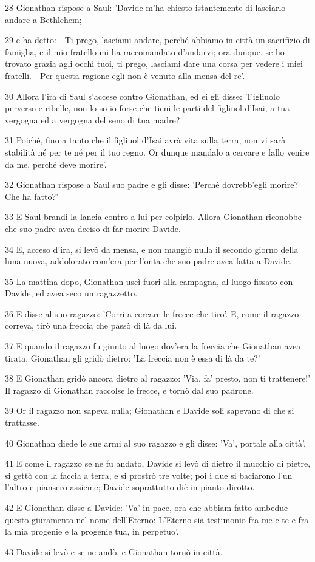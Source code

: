 \par 28 Gionathan rispose a Saul: 'Davide m'ha chiesto istantemente di lasciarlo andare a Bethlehem;
\par 29 e ha detto: - Ti prego, lasciami andare, perché abbiamo in città un sacrifizio di famiglia, e il mio fratello mi ha raccomandato d'andarvi; ora dunque, se ho trovato grazia agli occhi tuoi, ti prego, lasciami dare una corsa per vedere i miei fratelli. - Per questa ragione egli non è venuto alla mensa del re'.
\par 30 Allora l'ira di Saul s'accese contro Gionathan, ed ei gli disse: 'Figliuolo perverso e ribelle, non lo so io forse che tieni le parti del figliuol d'Isai, a tua vergogna ed a vergogna del seno di tua madre?
\par 31 Poiché, fino a tanto che il figliuol d'Isai avrà vita sulla terra, non vi sarà stabilità né per te né per il tuo regno. Or dunque mandalo a cercare e fallo venire da me, perché deve morire'.
\par 32 Gionathan rispose a Saul suo padre e gli disse: 'Perché dovrebb'egli morire? Che ha fatto?'
\par 33 E Saul brandì la lancia contro a lui per colpirlo. Allora Gionathan riconobbe che suo padre avea deciso di far morire Davide.
\par 34 E, acceso d'ira, si levò da mensa, e non mangiò nulla il secondo giorno della luna nuova, addolorato com'era per l'onta che suo padre avea fatta a Davide.
\par 35 La mattina dopo, Gionathan uscì fuori alla campagna, al luogo fissato con Davide, ed avea seco un ragazzetto.
\par 36 E disse al suo ragazzo: 'Corri a cercare le frecce che tiro'. E, come il ragazzo correva, tirò una freccia che passò di là da lui.
\par 37 E quando il ragazzo fu giunto al luogo dov'era la freccia che Gionathan avea tirata, Gionathan gli gridò dietro: 'La freccia non è essa di là da te?'
\par 38 E Gionathan gridò ancora dietro al ragazzo: 'Via, fa' presto, non ti trattenere!' Il ragazzo di Gionathan raccolse le frecce, e tornò dal suo padrone.
\par 39 Or il ragazzo non sapeva nulla; Gionathan e Davide soli sapevano di che si trattasse.
\par 40 Gionathan diede le sue armi al suo ragazzo e gli disse: 'Va', portale alla città'.
\par 41 E come il ragazzo se ne fu andato, Davide si levò di dietro il mucchio di pietre, si gettò con la faccia a terra, e si prostrò tre volte; poi i due si baciarono l'un l'altro e piansero assieme; Davide soprattutto diè in pianto dirotto.
\par 42 E Gionathan disse a Davide: 'Va' in pace, ora che abbiam fatto ambedue questo giuramento nel nome dell'Eterno: L'Eterno sia testimonio fra me e te e fra la mia progenie e la progenie tua, in perpetuo'.
\par 43 Davide si levò e se ne andò, e Gionathan tornò in città.

